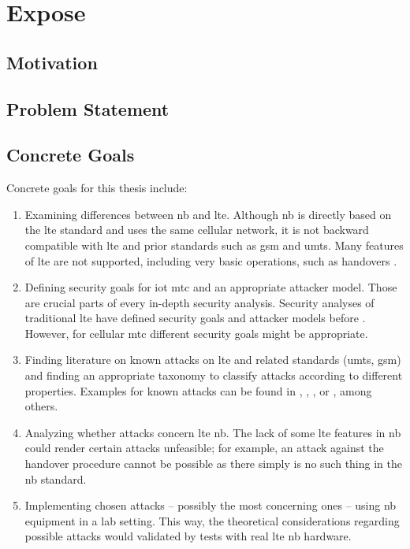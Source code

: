 \setcounter{chapter}{-1}
\chapter{Expose}

\section*{Motivation}

\section*{Problem Statement}


\section*{Concrete Goals}
Concrete goals for this thesis include:
\begin{enumerate}
	\item
		Examining differences between \ac{nb} and \ac{lte}.
		Although \ac{nb} is directly based on the \ac{lte} standard and uses the same cellular network, it is not backward compatible with \ac{lte} and prior standards such as \acs{gsm} and \acs{umts}.
		Many features of \ac{lte} are not supported, including very basic operations, such as handovers \cite{whitepaper}.
	\item
		Defining security goals for \ac{iot} \ac{mtc} and an appropriate attacker model.
		Those are crucial parts of every in-depth security analysis.
		Security analyses of traditional \ac{lte} have defined security goals and attacker models before \cite{inspector}.
		However, for cellular \ac{mtc} different security goals might be appropriate. 
	\item
		Finding literature on known attacks on \ac{lte} and related standards (\acs{umts}, \acs{gsm}) and finding an appropriate taxonomy to classify attacks according to different properties.
		Examples for known attacks can be found in \citet{inspector}, \citet{kune2012location}, \citet{mitmumts}, or \citet{shaik2015practical}, among others.
		
	\item
		Analyzing whether attacks concern \ac{lte} \ac{nb}.
		The lack of some \ac{lte} features in \ac{nb} could render certain attacks unfeasible;
		for example, an attack against the handover procedure cannot be possible as there simply is no such thing in the \ac{nb} standard.

	\item
		Implementing chosen attacks -- possibly the most concerning ones -- using \ac{nb} equipment in a lab setting.
		This way, the theoretical considerations regarding possible attacks would validated by tests with real \ac{lte} \ac{nb} hardware.
\end{enumerate}
